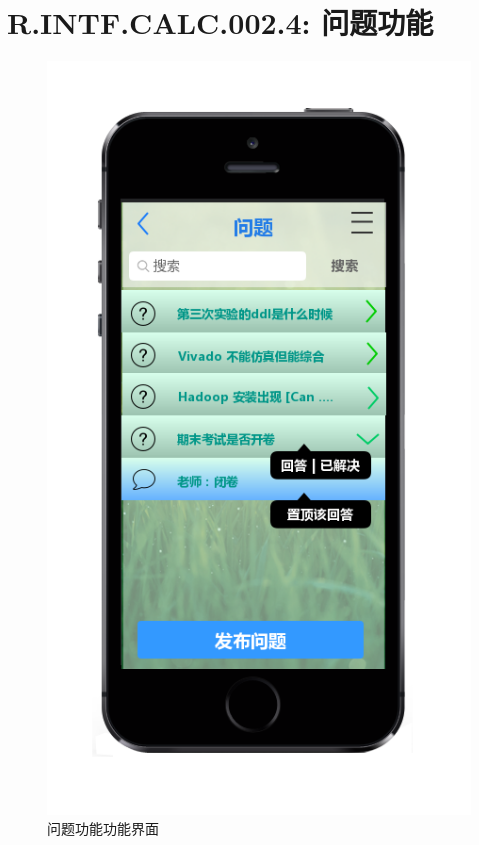     \section{\color{red}R.INTF.CALC.002.4: 问题功能}
    \begin{figure}[h]
        \centering
        \includegraphics[scale=0.6]{OutlineDesign/figures/问题功能功能界面.png}
        \caption{\color{red}问题功能功能界面}
        \label{fig:server_flow}
    \end{figure}
    \newpage
